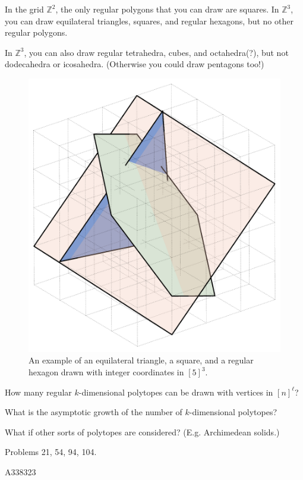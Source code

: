 \documentclass{article}
\begin{document}
In the grid $\mathbb Z^2$, the only regular polygons that you can draw are
squares. In $\mathbb Z^3$, you can draw equilateral triangles, squares, and
regular hexagons, but no other regular polygons.

In $\mathbb Z^3$, you can also draw regular tetrahedra, cubes, and octahedra(?),
but not dodecahedra or icosahedra. (Otherwise you could draw pentagons too!)
\begin{figure}[ht!]
  \centering
  \includegraphics[scale=0.18]{assets/116_problem/polygons_in_grid_3.png}
  \caption{
    An example of an equilateral triangle, a square, and a regular hexagon
    drawn with integer coordinates in $[5]^3$.
  }
\end{figure}

\begin{question}
  How many regular $k$-dimensional polytopes can be drawn with vertices in $[n]^\ell$?
\end{question}

\begin{related}
  \item What is the asymptotic growth of the number of $k$-dimensional polytopes?
  \item What if other sorts of polytopes are considered? (E.g. Archimedean solids.)
\end{related}

\begin{references}
  \item Problems 21, 54, 94, 104.
  \item A338323
\end{references}
\end{document}
